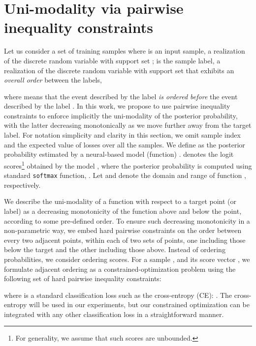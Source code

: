 \documentclass[8pt]{article}
\theoremstyle{definition}
\begin{document}
\section{Uni-modality via pairwise inequality constraints}
\label{sec:proposed-method}

Let us consider a set of training samples  where  is an input sample, a realization of the discrete random variable  with support set ;  is the sample label, a realization of the discrete random variable  with support set  that exhibits an \emph{overall order} between the labels,

where  means that the event described by the label  \emph{is ordered before} the event described by the label . In this work, we propose to use pairwise inequality constraints to enforce implicitly the uni-modality of the posterior probability, with the latter decreasing monotonically as we move further away from the target label. For notation simplicity and clarity in this section, we omit sample index  and the expected value of losses over all the samples. We define   as the posterior probability estimated by a neural-based model (function) .  denotes the logit scores\footnote{For generality, we assume that such scores are unbounded.} obtained by the model , where the posterior probability is computed using standard \verb+softmax+ function, . Let  and  denote the domain and range of function , respectively.


We describe the uni-modality of a function with respect to a target point (or label) as a decreasing monotonicity of the function above and below the point, according to some pre-defined order. To ensure such decreasing monotonicity in a non-parametric way, we embed hard pairwise constraints on the order between every two adjacent points, within each of two sets of points, one including those below the target and the other including those above. Instead of ordering probabilities, we consider ordering scores.
For a sample , and its score vector , we formulate adjacent ordering as a constrained-optimization problem using the following set of hard pairwise inequality constraints:

where  is a standard classification loss such as the cross-entropy (CE):
.
The cross-entropy will be used in our experiments, but our constrained optimization can be integrated with any other classification loss in a straightforward manner.
\end{document}

